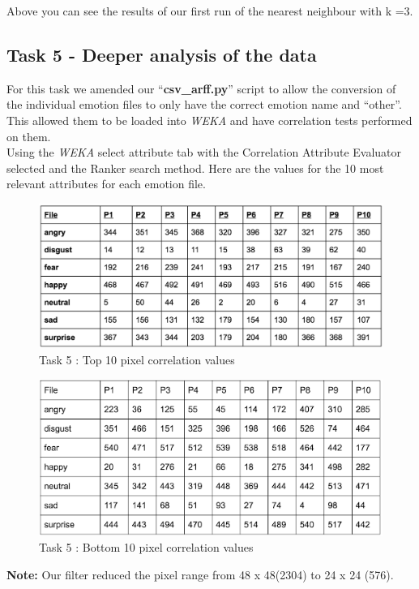 \documentclass[12pt]{article}
\begin{document}
Above you can see the results of our first run of the nearest neighbour with k =3.\\

\subsection{Task 5 - Deeper analysis of the data }

For this task we amended our ``\textbf{csv\_arff.py}'' script to allow the conversion of the individual emotion files to only have the correct emotion name and “other”. This allowed them to be loaded into \textit{WEKA} and have correlation tests performed on them.\\

Using the \textit{WEKA} select attribute tab with the Correlation Attribute Evaluator selected and the Ranker search method. Here are the values for the 10 most relevant attributes for each emotion file.\\

\begin{figure}[H]
	\centering
	\includegraphics[width=0.7\linewidth]{images/task5_results}
	\caption{Task 5 : Top 10 pixel correlation values}
	\label{fig:task5_results}
\end{figure}

\begin{figure}[H]
	\centering
	\includegraphics[width=0.7\linewidth]{images/task5_results_2}
	\caption{Task 5 : Bottom 10 pixel correlation values}
	\label{fig:task5_results_2}
\end{figure}

\textbf{Note:} Our filter reduced the pixel range from 48 x 48(2304)  to 24 x 24 (576).
\end{document}
